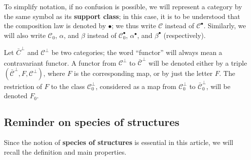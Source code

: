 \documentclass{article}
\newcommand{\oldpage}[1]{\marginpar{\footnotesize$\Big\vert$ \textit{p.~#1}}}
\newcommand{\unsure}[1]{{\color{purple}\textbf{#1}}}
\newcommand{\CC}{\mathcal{C}}
\newcommand{\dotc}{{\mathbin{\bullet}}}
\newcommand{\botc}{{\mathbin{\bot}}}
\begin{document}
\oldpage{351}
To simplify notation, if no confusion is possible, we will represent a category by the same symbol as its \unsure{support class};
in this case, it is to be understood that the composition law is denoted by $\dotc$;
we thus write $\CC$ instead of $\CC^\dotc$.
Similarly, we will also write $\CC_0$, $\alpha$, and $\beta$ instead of $\CC_0^\dotc$, $\alpha^\dotc$, and $\beta^\dotc$ (respectively).

Let $\bar{C}^\botc$ and $\CC^\botc$ be two categories;
the word ``functor'' will always mean a contravariant functor.
A functor from $\CC^\botc$ to $\bar{\CC}^\botc$ will be denoted either by a triple $(\bar{\CC}^\botc,F,\CC^\botc)$, where $F$ is the corresponding map, or by just the letter $F$.
The restriction of $F$ to the class $\CC_0^\botc$, considered as a map from $\CC_0^\botc$ to $\bar{\CC}_0^\botc$, will be denoted $F_0$.



\subsection{Reminder on \unsure{species of structures}}

Since the notion of \unsure{species of structures} \cite{3a} is essential in this article, we will recall the definition and main properties.





\nocite{*}
\printbibliography[heading=bibintoc,title=Bibliography]
\end{document}
